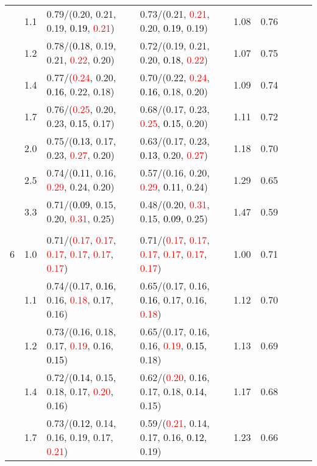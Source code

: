 \documentclass[10pt,a4paper]{report}
\begin{document}
\begin{table}[!htbp]
\begin{center}
{\begin{tabular}{ccllccccc}
			&1.1&0.79/(0.20, 0.21, 0.19, \textcolor{black}{0.19}, \textcolor{red}{0.21})&0.73/(0.21, \textcolor{red}{0.21}, 0.20, \textcolor{black}{0.19}, 0.19)&1.08&0.76\\
			&1.2&0.78/(\textcolor{black}{0.18}, 0.19, 0.21, \textcolor{red}{0.22}, 0.20)&0.72/(0.19, 0.21, 0.20, \textcolor{black}{0.18}, \textcolor{red}{0.22})&1.07&0.75\\
			&1.4&0.77/(\textcolor{red}{0.24}, 0.20, \textcolor{black}{0.16}, 0.22, 0.18)&0.70/(0.22, \textcolor{red}{0.24}, \textcolor{black}{0.16}, 0.18, 0.20)&1.09&0.74\\
			&1.7&0.76/(\textcolor{red}{0.25}, 0.20, 0.23, \textcolor{black}{0.15}, 0.17)&0.68/(0.17, 0.23, \textcolor{red}{0.25}, \textcolor{black}{0.15}, 0.20)&1.11&0.72\\
			&2.0&0.75/(\textcolor{black}{0.13}, 0.17, 0.23, \textcolor{red}{0.27}, 0.20)&0.63/(0.17, 0.23, \textcolor{black}{0.13}, 0.20, \textcolor{red}{0.27})&1.18&0.70\\
			&2.5&0.74/(\textcolor{black}{0.11}, 0.16, \textcolor{red}{0.29}, 0.24, 0.20)&0.57/(0.16, 0.20, \textcolor{red}{0.29}, \textcolor{black}{0.11}, 0.24)&1.29&0.65\\
			&3.3&0.71/(\textcolor{black}{0.09}, 0.15, 0.20, \textcolor{red}{0.31}, 0.25)&0.48/(0.20, \textcolor{red}{0.31}, 0.15, \textcolor{black}{0.09}, 0.25)&1.47&0.59\\
			&&&&\\
			6			&1.0&0.71/(\textcolor{red}{0.17}, \textcolor{red}{0.17}, \textcolor{red}{0.17}, \textcolor{red}{0.17}, \textcolor{red}{0.17}, \textcolor{red}{0.17})&0.71/(\textcolor{red}{0.17}, \textcolor{red}{0.17}, \textcolor{red}{0.17}, \textcolor{red}{0.17}, \textcolor{red}{0.17}, \textcolor{red}{0.17})&1.00&0.71\\
			&1.1&0.74/(0.17, \textcolor{black}{0.16}, 0.16, \textcolor{red}{0.18}, 0.17, 0.16)&0.65/(0.17, 0.16, \textcolor{black}{0.16}, 0.17, 0.16, \textcolor{red}{0.18})&1.12&0.70\\
			&1.2&0.73/(0.16, 0.18, 0.17, \textcolor{red}{0.19}, 0.16, \textcolor{black}{0.15})&0.65/(0.17, 0.16, 0.16, \textcolor{red}{0.19}, \textcolor{black}{0.15}, 0.18)&1.13&0.69\\
			&1.4&0.72/(\textcolor{black}{0.14}, 0.15, 0.18, 0.17, \textcolor{red}{0.20}, 0.16)&0.62/(\textcolor{red}{0.20}, 0.16, 0.17, 0.18, \textcolor{black}{0.14}, 0.15)&1.17&0.68\\
			&1.7&0.73/(\textcolor{black}{0.12}, 0.14, 0.16, 0.19, 0.17, \textcolor{red}{0.21})&0.59/(\textcolor{red}{0.21}, 0.14, 0.17, 0.16, \textcolor{black}{0.12}, 0.19)&1.23&0.66\\

\end{tabular}}
\end{center}
\end{table}
\end{document}
